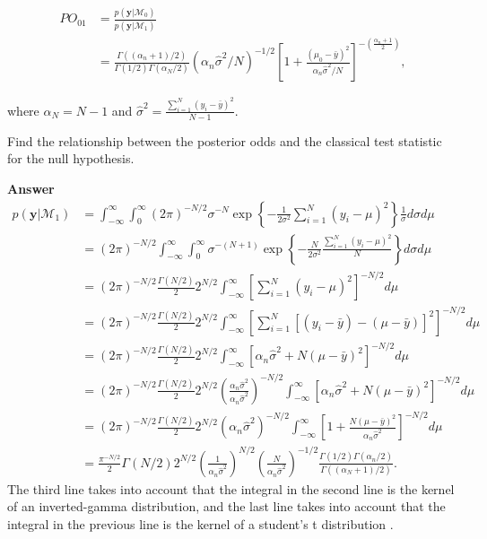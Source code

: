 \begin{enumerate}[leftmargin=*]
\begin{align*}
	PO_{01}&=\frac{p(\mathbf{y}|\mathcal{M}_0)}{p(\mathbf{y}|\mathcal{M}_1)}\\
	& =\frac{\Gamma((\alpha_n+1)/2)}{\Gamma(1/2)\Gamma(\alpha_N/2)}(\alpha_n\hat{\sigma}^2/N)^{-1/2}\left[1+\frac{(\mu_0-\bar{y})^2}{\alpha_n\hat{\sigma}^2/N}\right]^{-\left(\frac{\alpha_n+1}{2}\right)},
\end{align*}

where $\alpha_N=N-1$ and $\hat{\sigma}^2=\frac{\sum_{i=1}^N (y_i-\bar{y})^2}{N-1}$. 

Find the relationship between the posterior odds and the classical test statistic for the null hypothesis. 

\textbf{Answer}
{\footnotesize{
\begin{align*}
	p(\mathbf{y}|\mathcal{M}_1)&=\int_{-\infty}^{\infty}\int_{0}^{\infty} (2\pi)^{-N/2}\sigma^{-N}\exp\left\{-\frac{1}{2\sigma^2}\sum_{i=1}^N (y_i-\mu)^2\right\}\frac{1}{\sigma}d\sigma d\mu\\
	&=(2\pi)^{-N/2}\int_{-\infty}^{\infty}\int_{0}^{\infty} \sigma^{-(N+1)}\exp\left\{-\frac{N}{2\sigma^2}\frac{\sum_{i=1}^N (y_i-\mu)^2}{N}\right\}d\sigma d\mu\\
	&=(2\pi)^{-N/2}\frac{\Gamma(N/2)}{2}2^{N/2}\int_{-\infty}^{\infty}\left[\sum_{i=1}^N (y_i-\mu)^2\right]^{-N/2}d\mu\\
	&=(2\pi)^{-N/2}\frac{\Gamma(N/2)}{2}2^{N/2}\int_{-\infty}^{\infty}\left[\sum_{i=1}^N [(y_i-\bar{y})-(\mu-\bar{y})]^2\right]^{-N/2}d\mu\\
	&=(2\pi)^{-N/2}\frac{\Gamma(N/2)}{2}2^{N/2}\int_{-\infty}^{\infty}\left[\alpha_n\hat{\sigma}^2+N(\mu-\bar{y})^2\right]^{-N/2}d\mu\\
	&=(2\pi)^{-N/2}\frac{\Gamma(N/2)}{2}2^{N/2}\left(\frac{\alpha_n\hat{\sigma}^2}{\alpha_n\hat{\sigma}^2}\right)^{-N/2}\int_{-\infty}^{\infty}\left[\alpha_n\hat{\sigma}^2+N(\mu-\bar{y})^2\right]^{-N/2}d\mu\\
	&=(2\pi)^{-N/2}\frac{\Gamma(N/2)}{2}2^{N/2}\left(\alpha_n\hat{\sigma}^2\right)^{-N/2}\int_{-\infty}^{\infty}\left[1+\frac{N(\mu-\bar{y})^2}{\alpha_n\hat{\sigma}^2}\right]^{-N/2}d\mu\\
	&=\frac{\pi^{-N/2}}{2}\Gamma(N/2)2^{N/2}\left(\frac{1}{\alpha_n\hat{\sigma}^2}\right)^{N/2}\left(\frac{N}{\alpha_n\hat{\sigma}^2}\right)^{-1/2}\frac{\Gamma(1/2)\Gamma(\alpha_n/2)}{\Gamma((\alpha_N+1)/2)}.
\end{align*} 
}}
The third line takes into account that the integral in the second line is the kernel of an inverted-gamma distribution, and the last line takes into account that the integral in the previous line is the kernel of a student's t distribution \cite{zellner1996introduction}.



\end{enumerate}

